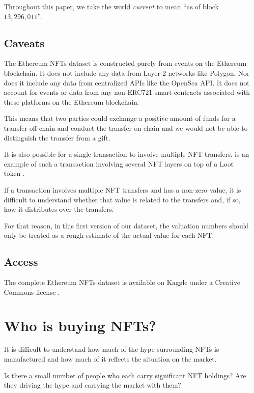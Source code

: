 \documentclass{article}
\begin{document}
Throughout this paper, we take the world \emph{current} to mean ``as of block $13,296,011$''.

\subsection{Caveats}

The Ethereum NFTs dataset is constructed purely from events on the Ethereum blockchain. It does not include any data from Layer 2 networks like Polygon. Nor does it include any data from centralized APIs like the OpenSea API. It does not account for events or data from any non-ERC721 smart contracts associated with these platforms on the Ethereum blockchain.

This means that two parties could exchange a positive amount of funds for a transfer off-chain and conduct the transfer on-chain and we would not be able to distinguish the transfer from a gift.

It is also possible for a single transaction to involve multiple NFT transfers. \cite{loot-middleware} is an example of such a transaction involving several NFT layers on top of a Loot token \cite{loot}.

If a transaction involves multiple NFT transfers and has a non-zero value, it is difficult to understand whether that value is related to the transfers and, if so, how it distributes over the transfers.

For that reason, in this first version of our dataset, the valuation numbers should only be treated as a rough estimate of the actual value for each NFT.

\subsection{Access}

The complete Ethereum NFTs dataset is available on Kaggle under a Creative Commons license \cite{ethereum-nfts}.

\section{Who is buying NFTs?}

It is difficult to understand how much of the hype surrounding NFTs is manufactured and how much of it reflects the situation on the market.

Is there a small number of people who each carry significant NFT holdings? Are they driving the hype and carrying the market with them?
\end{document}
